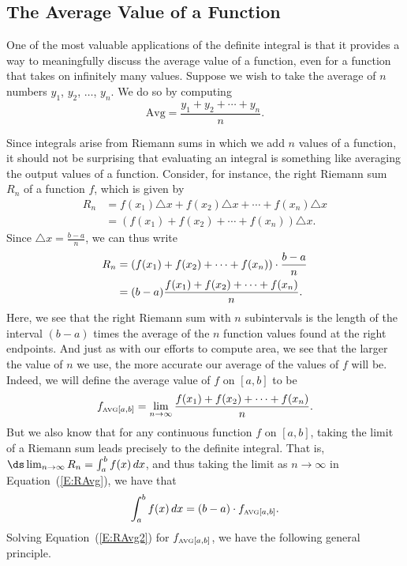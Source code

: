 \subsection*{The Average Value of a Function}

One of the most valuable applications of the definite integral is that it provides a way to meaningfully discuss the average value of a function, even for a function that takes on infinitely many values.  Suppose we wish to take the average of $n$ numbers $y_1$, $y_2$, $\ldots$, $y_n$.  We do so by computing
\[ \mbox{Avg} = \frac{y_1 + y_2 + \cdots + y_n}{n}. \]

Since integrals arise from Riemann sums in which we add $n$ values of a function, it should not be surprising that evaluating an integral is something like averaging the output values of a function.  Consider, for instance, the right Riemann sum $R_n$ of a function $f$, which is given by
\begin{align*}
R_n & = f(x_1) \triangle x + f(x_2) \triangle x + \cdots + f(x_n) \triangle x \\
& = (f(x_1) + f(x_2) + \cdots + f(x_n))\triangle x.
\end{align*}
Since $\triangle x = \frac{b-a}{n}$, we can thus write 
\begin{align} \label{E:RAvg}
R_n &  = (f(x_1) + f(x_2) + \cdots + f(x_n))\cdot \frac{b-a}{n} \notag \\
& = (b-a) \frac{f(x_1) + f(x_2) + \cdots + f(x_n)}{n}.
\end{align}
Here, we see that the right Riemann sum with $n$ subintervals is the length of the interval $(b-a)$ times the average of the $n$ function values found at the right endpoints.  And just as with our efforts to compute area, we see that the larger the value of $n$ we use, the more accurate our average of the values of $f$ will be.  Indeed, we will define the average value of $f$ on $[a,b]$ to be 
\[ f_{\mbox{\tiny{AVG}}[a,b]} = \lim_{n \to \infty} \frac{f(x_1) + f(x_2) + \cdots + f(x_n)}{n}.\]  
But we also know that for any continuous function $f$ on $[a,b]$, taking the limit of a Riemann sum leads precisely to the definite integral.  That is, $\ds \lim_{n \to \infty} R_n = \int_a^b f(x) \, dx$, and thus taking the limit as $n \to \infty$ in Equation~(\ref{E:RAvg}), we have that
\begin{equation} \label{E:RAvg2} %
\int_a^b f(x) \, dx = (b-a) \cdot f_{\mbox{\tiny{AVG}}[a,b]}.
\end{equation}
Solving Equation~(\ref{E:RAvg2}) for $f_{\mbox{\tiny{AVG}}[a,b]}$, we have the following general principle.

